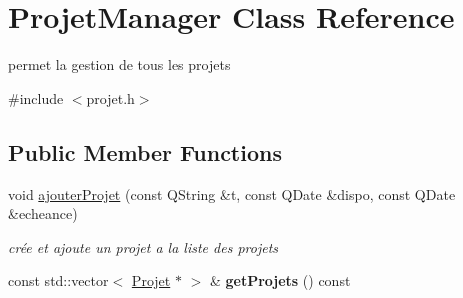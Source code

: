 \hypertarget{class_projet_manager}{}\section{Projet\+Manager Class Reference}
\label{class_projet_manager}


permet la gestion de tous les projets  




{\ttfamily \#include $<$projet.\+h$>$}

\subsection*{Public Member Functions}
\begin{DoxyCompactItemize}
\item 
void \hyperlink{class_projet_manager_a31177b18642c37e2dd80fcbdac7a15fd}{ajouter\+Projet} (const Q\+String \&t, const Q\+Date \&dispo, const Q\+Date \&echeance)
\begin{DoxyCompactList}\small\item\em crée et ajoute un projet a la liste des projets \end{DoxyCompactList}\item 
\hypertarget{class_projet_manager_a71cc215b928dfc0da7a87df0f24b8cfa}{}const std\+::vector$<$ \hyperlink{class_projet}{Projet} $\ast$ $>$ \& {\bfseries get\+Projets} () const \label{class_projet_manager_a71cc215b928dfc0da7a87df0f24b8cfa}


\end{DoxyCompactItemize}
